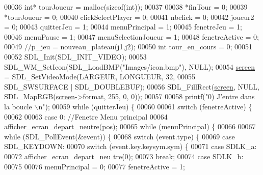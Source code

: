 \begin{DoxyCode}
00036         \textcolor{keywordtype}{int}* tourJoueur = malloc(\textcolor{keyword}{sizeof}(\textcolor{keywordtype}{int}));
00037 
00038         *finTour = 0;
00039         *tourJoueur = 0;
00040         clickSelectPlayer = 0;
00041         nbclick = 0;
00042         joueur2 = 0;
00043         quitterJeu = 1;
00044         menuPrincipal = 1;
00045         fenetreJeu = 1;
00046         menuPause = 1;
00047         menuSelectionJoueur = 1;
00048         fenetreActive = 0;
00049         \textcolor{comment}{//p\_jeu = nouveau\_plateau(j1,j2);}
00050         \textcolor{keywordtype}{int} tour\_en\_cours = 0;
00051 
00052         SDL\_Init(SDL\_INIT\_VIDEO);
00053         SDL\_WM\_SetIcon(SDL\_LoadBMP(\textcolor{stringliteral}{"Images/icon.bmp"}), NULL);
00054         \hyperlink{fonction_interface_8h_a78fa3957d73de49cb81d047857504218}{screen} = SDL\_SetVideoMode(LARGEUR, LONGUEUR, 32,
00055                         SDL\_SWSURFACE | SDL\_DOUBLEBUF);
00056         SDL\_FillRect(\hyperlink{fonction_interface_8h_a78fa3957d73de49cb81d047857504218}{screen}, NULL, SDL\_MapRGB(\hyperlink{fonction_interface_8h_a78fa3957d73de49cb81d047857504218}{screen}->format, 255, 0, 0));
00057 
00058         printf(\textcolor{stringliteral}{"0) J'entre dans la boucle \(\backslash\)n"});
00059         \textcolor{keywordflow}{while} (quitterJeu) \{
00060 
00061                 \textcolor{keywordflow}{switch} (fenetreActive) \{
00062 
00063                 \textcolor{keywordflow}{case} 0: \textcolor{comment}{//Fenetre Menu principal}
00064                         afficher\_ecran\_depart\_neutre(pos);
00065                         \textcolor{keywordflow}{while} (menuPrincipal) \{
00066 
00067                                 \textcolor{keywordflow}{while} (SDL\_PollEvent(&event)) \{
00068                                         \textcolor{keywordflow}{switch} (event.type) \{
00069                                         \textcolor{keywordflow}{case} SDL\_KEYDOWN:
00070                                                 \textcolor{keywordflow}{switch} (event.key.keysym.sym) \{
00071                                                 \textcolor{keywordflow}{case} SDLK\_a:
00072                                                         afficher\_ecran\_depart\_neu
      tre(0);
00073                                                         \textcolor{keywordflow}{break};
00074                                                 \textcolor{keywordflow}{case} SDLK\_b:
00075 
00076                                                         menuPrincipal = 0;
00077                                                         fenetreActive = 1;

\end{DoxyCode}

